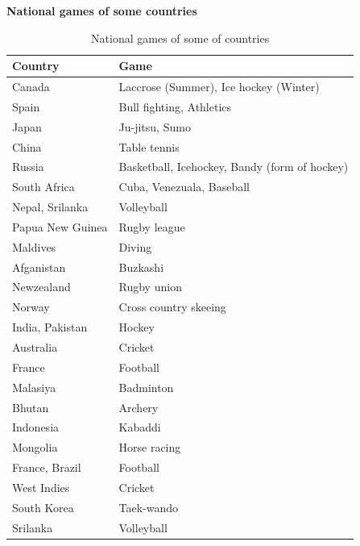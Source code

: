 \documentclass[
]{book}
\begin{document}
\textbf{National games of some countries}

\begin{longtable}[t]{ll}
\caption{\label{tab:national-games}National games of some of countries}\\
\toprule
Country & Game\\
\midrule
Canada & Laccrose (Summer), Ice hockey (Winter)\\
Spain & Bull fighting, Athletics\\
Japan & Ju-jitsu, Sumo\\
China & Table tennis\\
Russia & Basketball, Icehockey, Bandy (form of hockey)\\
\addlinespace
South Africa & Cuba, Venezuala, Baseball\\
Nepal, Srilanka & Volleyball\\
Papua New Guinea & Rugby league\\
Maldives & Diving\\
Afganistan & Buzkashi\\
\addlinespace
Newzealand & Rugby union\\
Norway & Cross country skeeing\\
India, Pakistan & Hockey\\
Australia & Cricket\\
France & Football\\
\addlinespace
Malasiya & Badminton\\
Bhutan & Archery\\
Indonesia & Kabaddi\\
Mongolia & Horse racing\\
France, Brazil & Football\\
\addlinespace
West Indies & Cricket\\
South Korea & Taek-wando\\
Srilanka & Volleyball\\
\bottomrule
\end{longtable}



  
\end{document}
